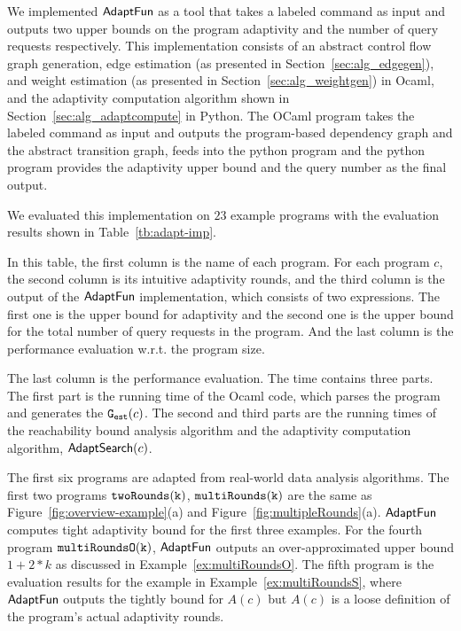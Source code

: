 
We implemented $\textsf{AdaptFun}$ as a tool that takes a labeled command as input 
and outputs two upper bounds on the program adaptivity and the number of query requests respectively.
This implementation consists of an 
abstract control flow graph generation,
edge estimation (as presented in Section~\ref{sec:alg_edgegen}), and weight estimation (as presented in Section~\ref{sec:alg_weightgen}) in Ocaml, 
and the adaptivity computation algorithm shown in Section~\ref{sec:alg_adaptcompute} in Python.
The OCaml program takes the labeled command as input and outputs the program-based dependency graph and
the abstract transition graph,
feeds into the python program and the python program provides the adaptivity upper bound and the query number as the final output.

We evaluated this implementation on $23$ example programs with the evaluation results shown in Table~\ref{tb:adapt-imp}.


In this table,
the first column is the name of each program.
For each program $c$, the second column is its intuitive adaptivity rounds,
and the third column is the output of the $\textsf{AdaptFun}$ implementation, which consists of two expressions.
The first one is the upper bound for adaptivity and the second one is the 
upper bound for the total number of query requests in the program. And the last column is the performance evaluation w.r.t. the program size.

The last column is the performance evaluation.
The time contains three parts. The first part is the running time of the Ocaml code, which parses the program and generates the $\mathtt{{G_{est}}}(c)$.
The second and third parts are the running times of the reachability bound analysis algorithm
and the adaptivity computation algorithm, $\mathsf{AdaptSearch}(c)$.

The first six programs are adapted from real-world data analysis algorithms.
The first two programs $\mathtt{twoRounds(k)}$, $ \mathtt{multiRounds(k)}$ are the same as Figure~\ref{fig:overview-example}(a) and Figure~\ref{fig:multipleRounds}(a).
$\textsf{AdaptFun}$ computes tight adaptivity bound for the first three examples.
For the fourth program $\mathtt{multiRoundsO(k)}$, $\textsf{AdaptFun}$ outputs an over-approximated upper bound $1 + 2*k$ 
as discussed in Example~\ref{ex:multiRoundsO}. 
The fifth program is the evaluation results for the example in Example~\ref{ex:multiRoundsS}, where $\textsf{AdaptFun}$ outputs the tightly bound for $A(c)$ but $A(c)$ is a loose definition of the program's actual adaptivity rounds.
%

